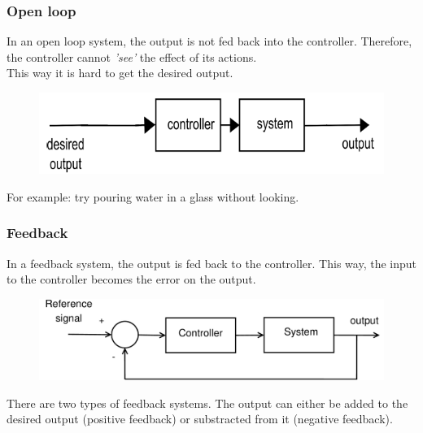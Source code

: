 \documentclass{beamer}
\begin{document}
\begin{frame}
\frametitle{Open loop}
In an open loop system, the output is not fed back into the controller. Therefore, the controller cannot \textit{'see'} the effect of its actions. \\
This way it is hard to get the desired output.\\
\medskip
\begin{figure}
\includegraphics[width=1\linewidth]{open_loop2}
\end{figure}
\bigskip
For example: try pouring water in a glass without looking.
\end{frame}


\begin{frame}
\frametitle{Feedback}
In a feedback system, the output is fed back to the controller. This way, the  input to the controller becomes the error on the output. 
\medskip
\begin{figure}
\includegraphics[width=1\linewidth]{closed_loop}
\end{figure}
There are two types of feedback systems. The output can either be added to the desired output (positive feedback) or substracted from it (negative feedback).
\end{frame}

\end{document}
